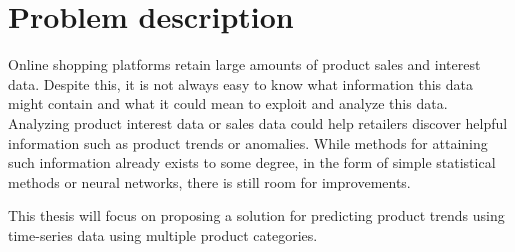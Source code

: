 
\section{Problem description}
\label{section:Introduction:ProblemDescription}
Online shopping platforms retain large amounts of product sales and interest data.
Despite this, it is not always easy to know what information this data might contain and what it could mean to exploit and analyze this data.
Analyzing product interest data or sales data could help retailers discover helpful information such as product trends or anomalies.
While methods for attaining such information already exists to some degree, in the form of simple statistical methods or neural networks,
there is still room for improvements.


This thesis will focus on proposing a solution for predicting product trends using time-series data using multiple product categories.


